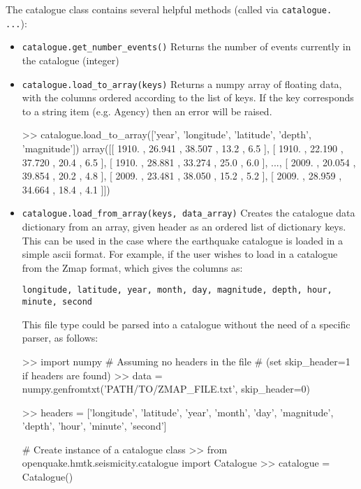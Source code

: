 The catalogue class contains several helpful methods (called via \verb=catalogue. ...=):
\begin{itemize}
\item \verb=catalogue.get_number_events()= Returns the number of events currently in the catalogue (integer)

\item \verb=catalogue.load_to_array(keys)= Returns a numpy array of floating data, with the columns ordered according to the list of keys. If the key corresponds to a string item (e.g. Agency) then an error will be raised.

\begin{python}[frame=single]
>> catalogue.load_to_array(['year', 'longitude', 'latitude',
                            'depth', 'magnitude'])
array([[ 1910. ,  26.941 ,  38.507 ,  13.2 ,  6.5 ],
       [ 1910. ,  22.190 ,  37.720 ,  20.4 ,  6.5 ],
       [ 1910. ,  28.881 ,  33.274 ,  25.0 ,  6.0 ],
       ..., 
       [ 2009. ,  20.054 ,  39.854 ,  20.2 ,  4.8 ],
       [ 2009. ,  23.481 ,  38.050 ,  15.2 ,  5.2 ],
       [ 2009. ,  28.959 ,  34.664 ,  18.4 ,  4.1 ]]) 
\end{python}

\item \verb=catalogue.load_from_array(keys, data_array)= Creates the catalogue data dictionary from an array, given header as an ordered list of dictionary keys. This can be used in the case where the earthquake catalogue is loaded in a simple ascii format. For example, if the user wishes to load in a catalogue from the Zmap format, which gives the columns as:

\begin{verbatim}
longitude, latitude, year, month, day, magnitude, depth, hour, 
minute, second
\end{verbatim}

This file type could be parsed into a catalogue without the need of a specific parser, as follows:

\begin{python}[frame=single]
>> import numpy
# Assuming no headers in the file 
# (set skip_header=1 if headers are found)
>> data = numpy.genfromtxt('PATH/TO/ZMAP_FILE.txt',
                           skip_header=0)

>> headers = ['longitude', 'latitude', 'year', 'month',
              'day', 'magnitude', 'depth', 'hour', 
              'minute', 'second']

# Create instance of a catalogue class
>> from openquake.hmtk.seismicity.catalogue import Catalogue
>> catalogue = Catalogue()


\end{python}
\end{itemize}
